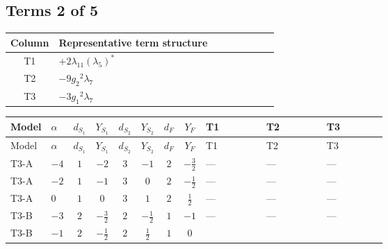 \documentclass[8pt]{article}
\begin{document}
\begin{landscape}
\subsection*{Terms 2 of 5}
\begin{center}
\begin{tabular}{@{}c >{\raggedright\arraybackslash}p{0.82\linewidth}@{}}
\toprule
Column & Representative term structure \\
\midrule
T1 & \(\displaystyle +2 {\lambda_{11}} \left({\lambda_5}\right)^{*}\) \\
\midrule
T2 & \(\displaystyle -9 {g_2}^2 {\lambda_{7}}\) \\
\midrule
T3 & \(\displaystyle -3 {g_1}^2 {\lambda_{7}}\) \\
\midrule
\bottomrule
\end{tabular}
\end{center}
\smallskip
\tiny
\begin{longtable}{@{}llcccccc >{\raggedright\arraybackslash}p{0.21\linewidth} >{\raggedright\arraybackslash}p{0.21\linewidth} >{\raggedright\arraybackslash}p{0.21\linewidth}@{}}
\toprule
Model & $\alpha$ & $d_{S_1}$ & $Y_{S_1}$ & $d_{S_2}$ & $Y_{S_2}$ & $d_F$ & $Y_F$ & T1 & T2 & T3 \\
\midrule
\endfirsthead
\toprule
Model & $\alpha$ & $d_{S_1}$ & $Y_{S_1}$ & $d_{S_2}$ & $Y_{S_2}$ & $d_F$ & $Y_F$ & T1 & T2 & T3 \\
\midrule
\endhead
T3-A & $-4$ & $1$ & $-2$ & $3$ & $-1$ & $2$ & $-\frac{3}{2}$ & --- & --- & --- \\
\midrule
T3-A & $-2$ & $1$ & $-1$ & $3$ & $0$ & $2$ & $-\frac{1}{2}$ & --- & --- & --- \\
\midrule
T3-A & $0$ & $1$ & $0$ & $3$ & $1$ & $2$ & $\frac{1}{2}$ & --- & --- & --- \\
\midrule
T3-B & $-3$ & $2$ & $-\frac{3}{2}$ & $2$ & $-\frac{1}{2}$ & $1$ & $-1$ & --- & --- & --- \\
\midrule
T3-B & $-1$ & $2$ & $-\frac{1}{2}$ & $2$ & $\frac{1}{2}$ & $1$ & $0$ & \scriptsize\adjustbox{max width=\linewidth}{$\begin{gathered} +2 {\lambda_{11}} \left({\lambda_5}\right)^{*}\end{gathered}$} & \scriptsize\adjustbox{max width=\linewidth}{$\begin{gathered} -9 {g_2}^2 {\lambda_{7}}\end{gathered}$} & \scriptsize\adjustbox{max width=\linewidth}{$\begin{gathered} -3 {g_1}^2 {\lambda_{7}}\end{gathered}$} \\

\end{longtable}
\end{landscape}
\end{document}

